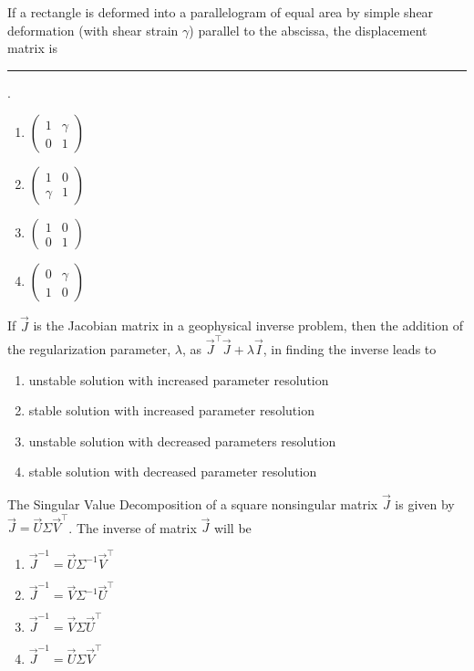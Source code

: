 \item If a rectangle is deformed into a parallelogram of equal area by simple shear deformation (with shear strain $\gamma$) parallel to the abscissa, the displacement matrix is \rule{1cm}{0.01pt}.
\hfill{}
\begin{multicols}{4}
\begin{enumerate}
\item $\begin{pmatrix}1 & \gamma \\ 0 & 1\end{pmatrix}$
\item $\begin{pmatrix}1 & 0 \\ \gamma & 1\end{pmatrix}$
\item $\begin{pmatrix}1 & 0 \\ 0 & 1\end{pmatrix}$
\item $\begin{pmatrix}0 & \gamma \\ 1 & 0\end{pmatrix}$
\end{enumerate}
\end{multicols}
\item If $\vec{J}$ is the Jacobian matrix in a geophysical inverse problem, then the addition of the regularization parameter, $\lambda$, as $\vec{J}^{\top}\vec{J} + \lambda \vec{I}$, in finding the inverse leads to
\hfill{}
\begin{enumerate}
\item unstable solution with increased parameter resolution
\item stable solution with increased parameter resolution
\item unstable solution with decreased parameters resolution
\item stable solution with decreased parameter resolution
\end{enumerate}
\item The Singular Value Decomposition of a square nonsingular matrix $\vec{J}$ is given by $\vec{J}=\vec{U}\Sigma \vec{V}^{\top}$. The inverse of matrix $\vec{J}$ will be
\hfill{}
\begin{multicols}{4}
\begin{enumerate}
\item $\vec{J}^{-1}=\vec{U}\Sigma^{-1}\vec{V}^{\top}$
\item $\vec{J}^{-1}=\vec{V}\Sigma^{-1}\vec{U}^{\top}$
\item $\vec{J}^{-1}=\vec{V}\Sigma \vec{U}^{\top}$
\item $\vec{J}^{-1}=\vec{U}\Sigma \vec{V}^{\top}$
\end{enumerate}
\end{multicols}
